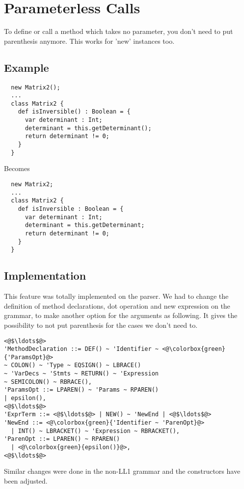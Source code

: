 \section{Parameterless Calls}
\textnormal{To define or call a method which takes no parameter, you don't need
  to put parenthesis anymore. This works for 'new' instances too.}

\subsection{Example}

\begin{lstlisting}
  new Matrix2();
  ...
  class Matrix2 {
    def isInversible() : Boolean = {
      var determinant : Int;
      determinant = this.getDeterminant();
      return determinant != 0;
    }
  }
\end{lstlisting}
\textmd{Becomes}
\begin{lstlisting}
  new Matrix2;
  ...
  class Matrix2 {
    def isInversible : Boolean = {
      var determinant : Int;
      determinant = this.getDeterminant;
      return determinant != 0;
    }
  }
\end{lstlisting}

\subsection{Implementation}

\textnormal{This feature was totally implemented on the parser. We had to change
  the definition of method declarations, dot operation and new expression on the
  grammar, to make another option for the arguments as following. It gives the
  possibility to not put parenthesis for the cases we don't need to.}

\begin{lstlisting}
<@$\ldots$@>
'MethodDeclaration ::= DEF() ~ 'Identifier ~ <@\colorbox{green}{'ParamsOpt}@>
~ COLON() ~ 'Type ~ EQSIGN() ~ LBRACE()  
~ 'VarDecs ~ 'Stmts ~ RETURN() ~ 'Expression
~ SEMICOLON() ~ RBRACE(),
'ParamsOpt ::= LPAREN() ~ 'Params ~ RPAREN()
| epsilon(),
<@$\ldots$@>
'ExprTerm ::= <@$\ldots$@> | NEW() ~ 'NewEnd | <@$\ldots$@> 
'NewEnd ::= <@\colorbox{green}{'Identifier ~ 'ParenOpt}@>
  | INT() ~ LBRACKET() ~ 'Expression ~ RBRACKET(),
'ParenOpt ::= LPAREN() ~ RPAREN()
  | <@\colorbox{green}{epsilon()}@>,
<@$\ldots$@>
\end{lstlisting}

\textnormal{Similar changes were done in the non-LL1 grammar and the
  constructors have been adjusted.}